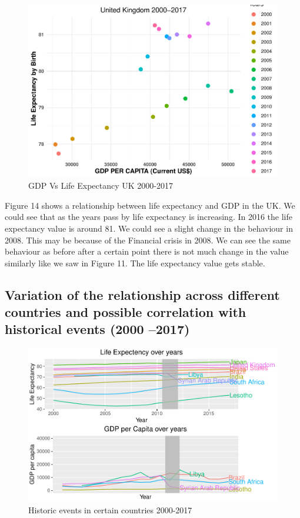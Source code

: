 \documentclass[
]{article}
\begin{document}
\begin{figure}
\centering
\includegraphics{Report_files/figure-latex/plot14-1.pdf}
\caption{GDP Vs Life Expectancy UK 2000-2017}
\end{figure}

Figure 14 shows a relationship between life expectancy and GDP in the
UK. We could see that as the years pass by life expectancy is
increasing. In 2016 the life expectancy value is around 81. We could see
a slight change in the behaviour in 2008. This may be because of the
Financial crisis in 2008. We can see the same behaviour as before after
a certain point there is not much change in the value similarly like we
saw in Figure 11. The life expectancy value gets stable.

\hypertarget{variation-of-the-relationship-across-different-countries-and-possible-correlation-with-historical-events-2000-2017-2}{%
\subsection{Variation of the relationship across different countries and
possible correlation with historical events (2000
--2017)}\label{variation-of-the-relationship-across-different-countries-and-possible-correlation-with-historical-events-2000-2017-2}}

\begin{figure}
\centering
\includegraphics{Report_files/figure-latex/plot15-1.pdf}
\caption{Historic events in certain countries 2000-2017}
\end{figure}
\end{document}
